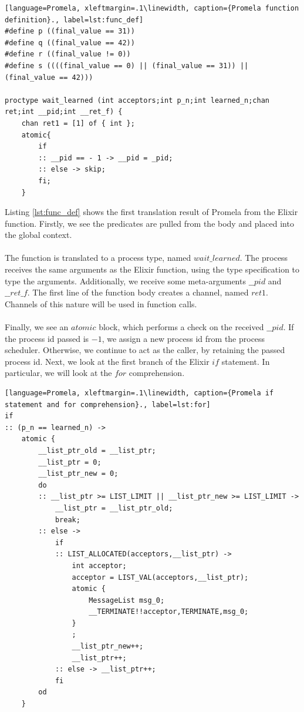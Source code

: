 \begin{lstlisting}[language=Promela, xleftmargin=.1\linewidth, caption={Promela function definition}., label=lst:func_def]
#define p ((final_value == 31))
#define q ((final_value == 42))
#define r ((final_value != 0))
#define s ((((final_value == 0) || (final_value == 31)) || (final_value == 42)))

proctype wait_learned (int acceptors;int p_n;int learned_n;chan ret;int __pid;int __ret_f) {
    chan ret1 = [1] of { int }; 
    atomic{
        if
        :: __pid == - 1 -> __pid = _pid;
        :: else -> skip;
        fi;
    }
\end{lstlisting}
Listing \ref{lst:func_def} shows the first translation result of Promela from the Elixir function. Firstly, we see the predicates are pulled from the body and placed into the global context.
\\ \\
The function is translated to a process type, named $wait\_learned$. The process receives the same arguments as the Elixir function, using the type specification to type the arguments. Additionally, we receive some meta-arguments $\_\_pid$ and $\_\_ret\_f$. The first line of the function body creates a channel, named $ret1$. Channels of this nature will be used in function calls.
\\ \\
Finally, we see an $atomic$ block, which performs a check on the received $\_\_pid$. If the process id passed is $-1$, we assign a new process id from the process scheduler. Otherwise, we continue to act as the caller, by retaining the passed process id.
Next, we look at the first branch of the Elixir $if$ statement. In particular, we will look at the $for$ comprehension.
\begin{lstlisting}[language=Promela, xleftmargin=.1\linewidth, caption={Promela if statement and for comprehension}., label=lst:for]
if
:: (p_n == learned_n) -> 
    atomic {
        __list_ptr_old = __list_ptr;
        __list_ptr = 0;
        __list_ptr_new = 0;
        do
        :: __list_ptr >= LIST_LIMIT || __list_ptr_new >= LIST_LIMIT -> 
            __list_ptr = __list_ptr_old;
            break;
        :: else -> 
            if
            :: LIST_ALLOCATED(acceptors,__list_ptr) -> 
                int acceptor;
                acceptor = LIST_VAL(acceptors,__list_ptr);
                atomic {
                    MessageList msg_0;
                    __TERMINATE!!acceptor,TERMINATE,msg_0; 
                }
                ;
                __list_ptr_new++;
                __list_ptr++;
            :: else -> __list_ptr++;
            fi
        od
    }
\end{lstlisting}

